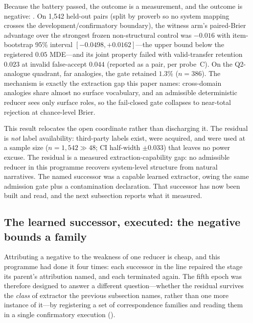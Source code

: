 Because the battery passed, the outcome is a measurement, and the outcome is negative: . On 1{,}542 held-out pairs (split by proverb so no system mapping crosses the development/confirmatory boundary), the witness arm's paired-Brier advantage over the strongest frozen non-structural control was $-0.016$ with item-bootstrap 95\% interval $[-0.0498,+0.0162]$---the upper bound below the registered $0.05$ MDE---and its joint property failed with valid-transfer retention $0.023$ at invalid false-accept $0.044$ (reported as a pair, per probe~C). On the Q2-analogue quadrant, far analogies, the gate retained $1.3\%$ ($n=386$). The mechanism is exactly the extraction gap this paper names: cross-domain analogies share almost no surface vocabulary, and an admissible deterministic reducer sees only surface roles, so the fail-closed gate collapses to near-total rejection at chance-level Brier.

This result relocates the open coordinate rather than discharging it. The residual is \emph{not} label availability: third-party labels exist, were acquired, and were used at a sample size ($n=1{,}542 \gg 48$; CI half-width $\pm0.033$) that leaves no power excuse. The residual is a measured extraction-capability gap: no admissible reducer in this programme recovers system-level structure from natural narratives. The named successor was a capable learned extractor, owing the same admission gate plus a contamination declaration. That successor has now been built and read, and the next subsection reports what it measured.

\subsection{The learned successor, executed: the negative bounds a family}
\label{sec:multifamily}

Attributing a negative to the weakness of one reducer is cheap, and this programme had done it four times: each successor in the line repaired the stage its parent's attribution named, and each terminated again. The fifth epoch was therefore designed to answer a different question---whether the residual survives the \emph{class} of extractor the previous subsection names, rather than one more instance of it---by registering a set of correspondence families and reading them in a single confirmatory execution ().

